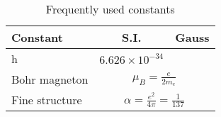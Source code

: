 \begin{table}
    \caption{Frequently used constants}
    \label{tab:constants}
    \begin{center}
	\begin{tabular}{l|cc}
	    \hline
	    Constant    & S.I.  & Gauss \\
	    \hline
	    h	& $6.626\times10^{-34}$	&   \\
	    \hline
	    Bohr magneton   & \multicolumn{2}{c}{$\mu_B=\frac{e}{2m_e}$} \\
	    Fine structure  & \multicolumn{2}{c}{$\alpha=\frac{e^2}{4\pi}=\frac{1}{137}$}	\\
	    \hline
	\end{tabular}
    \end{center}
\end{table}
